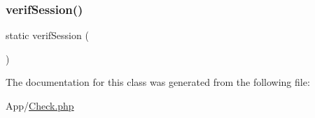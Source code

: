 \subsubsection{\texorpdfstring{verif\+Session()}{verifSession()}}
{\footnotesize\ttfamily static verif\+Session (\begin{DoxyParamCaption}{ }\end{DoxyParamCaption})\hspace{0.3cm}{\ttfamily [static]}}



The documentation for this class was generated from the following file\+:\begin{DoxyCompactItemize}
\item 
App/\hyperlink{_check_8php}{Check.\+php}\end{DoxyCompactItemize}
